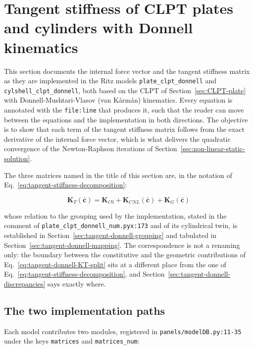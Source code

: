 \section{Tangent stiffness of CLPT plates and cylinders with Donnell kinematics}\label{sec:tangent-CLPT-Donnell}

This section documents the internal force vector and the tangent stiffness matrix as they are implemented in the Ritz models \texttt{plate\_clpt\_donnell} and \texttt{cylshell\_clpt\_donnell}, both based on the CLPT of Section~\ref{sec:CLPT-plate} with Donnell-Mushtari-Vlasov (van K\'arm\'an) kinematics. Every equation is annotated with the \texttt{file:line} that produces it, such that the reader can move between the equations and the implementation in both directions. The objective is to show that each term of the tangent stiffness matrix follows from the exact derivative of the internal force vector, which is what delivers the quadratic convergence of the Newton-Raphson iterations of Section~\ref{sec:non-linear-static-solution}.

The three matrices named in the title of this section are, in the notation of Eq.~\ref{eq:tangent-stiffness-decomposition}:

\begin{equation}\label{eq:tangent-donnell-KT-split}
	\boldsymbol{K}_T(\bar{\boldsymbol{c}}) = \boldsymbol{K}_{C0} + \boldsymbol{K}_{CNL}(\bar{\boldsymbol{c}}) + \boldsymbol{K}_G(\bar{\boldsymbol{c}})
\end{equation}

\noindent whose relation to the grouping used by the implementation, stated in the comment of \texttt{plate\_clpt\_donnell\_num.pyx:173} and of its cylindrical twin, is established in Section~\ref{sec:tangent-donnell-grouping} and tabulated in Section~\ref{sec:tangent-donnell-mapping}. The correspondence is not a renaming only: the boundary between the constitutive and the geometric contributions of Eq.~\ref{eq:tangent-donnell-KT-split} sits at a different place from the one of Eq.~\ref{eq:tangent-stiffness-decomposition}, and Section~\ref{sec:tangent-donnell-discrepancies} says exactly where.

\subsection{The two implementation paths}\label{sec:tangent-donnell-paths}

Each model contributes two modules, registered in \texttt{panels/modelDB.py:11-35} under the keys \texttt{matrices} and \texttt{matrices\_num}:

